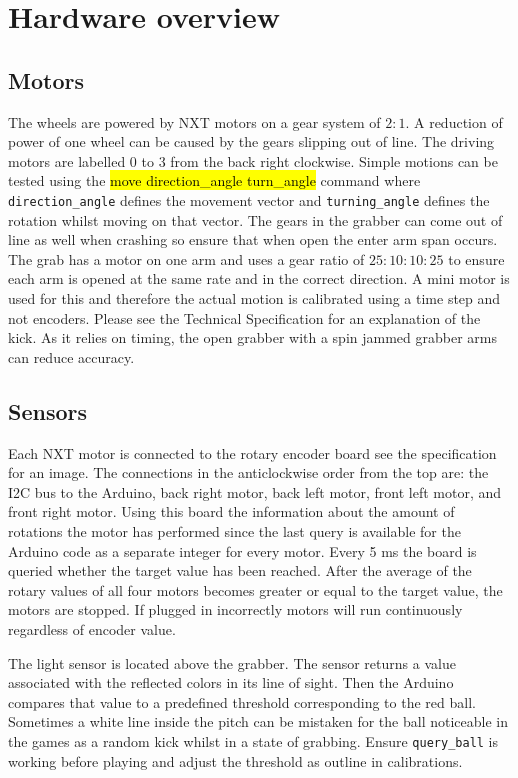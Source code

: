 \documentclass[a4paper,12pt]{article}
\newcommand{\hg}[1]{\hl{\ttfamily #1}}
\begin{document}
\section{Hardware overview}

\subsection{Motors}

The wheels are powered by NXT motors on a gear system of $2:1$. A reduction of power of one wheel can be caused by the gears slipping out of line. The driving motors are labelled 0 to 3 from the back right clockwise. Simple motions can be tested using the \hg{move direction\_angle turn\_angle} command where \texttt{direction\_angle} defines the movement vector and \texttt{turning\_angle} defines the rotation whilst moving on that vector. The gears in the grabber can come out of line as well when crashing so ensure that when open the enter arm span occurs. The grab has a motor on one arm and uses a gear ratio of $25:10:10:25$ to ensure each arm is opened at the same rate and in the correct direction. A mini motor is used for this and therefore the actual motion is calibrated using a time step and not encoders. Please see the Technical Specification for an explanation of the kick. As it relies on timing, the open grabber with a spin jammed grabber arms can reduce accuracy.

\subsection{Sensors}

Each NXT motor is connected to the rotary encoder board see the specification for an image. The connections in the anticlockwise order from the top are: the I2C bus to the Arduino, back right motor, back left motor, front left motor, and front right motor. Using this board the information about the amount of rotations the motor has performed since the last query is available for the Arduino code as a separate integer for every motor. Every 5 ms the board is queried whether the target value has been reached. After the average of the rotary values of all four motors becomes greater or equal to the target value, the motors are stopped. If plugged in incorrectly motors will run continuously regardless of encoder value.

The light sensor is located above the grabber. The sensor returns a value associated with the reflected colors in its line of sight. Then the Arduino compares that value to a predefined threshold corresponding to the red ball. Sometimes a white line inside the pitch can be mistaken for the ball noticeable in the games as a random kick whilst in a state of grabbing. Ensure \texttt{query\_ball} is working before playing and adjust the threshold as outline in calibrations.
\end{document}
